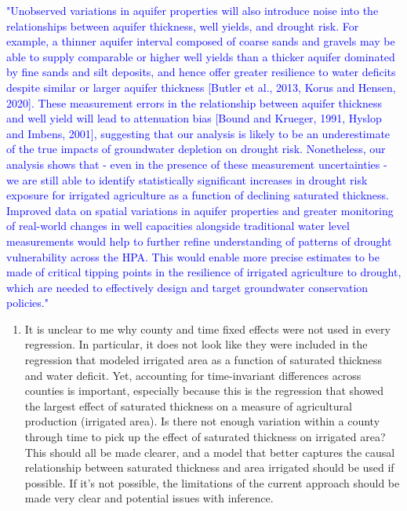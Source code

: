 \documentclass[
]{article}
\providecommand{\tightlist}{%
  \setlength{\itemsep}{0pt}\setlength{\parskip}{0pt}}
\begin{document}
\textcolor{blue}{"Unobserved variations in aquifer properties will also introduce noise into the relationships between aquifer thickness, well yields, and drought risk. For example, a thinner aquifer interval composed of coarse sands and gravels may be able to supply comparable or higher well yields than a thicker aquifer dominated by fine sands and silt deposits, and hence offer greater resilience to water deficits despite similar or larger aquifer thickness [Butler et al., 2013, Korus and Hensen, 2020]. These measurement errors in the relationship between aquifer thickness and well yield will lead to attenuation bias [Bound and Krueger, 1991, Hyslop and Imbens, 2001], suggesting that our analysis is likely to be an underestimate of the true impacts of groundwater depletion on drought risk. Nonetheless, our analysis shows that - even in the presence of these measurement uncertainties - we are still able to identify statistically significant increases in drought risk exposure for irrigated agriculture as a function of declining saturated thickness. Improved data on spatial variations in aquifer properties and greater monitoring of real-world changes in well capacities alongside traditional water level measurements would help to further refine understanding of patterns of drought vulnerability across the HPA. This would enable more precise estimates to be made of critical tipping points in the resilience of irrigated agriculture to drought, which are needed to effectively design and target groundwater conservation policies."}

\begin{enumerate}
\def\labelenumi{\arabic{enumi}.}
\setcounter{enumi}{2}
\tightlist
\item
  It is unclear to me why county and time fixed effects were not used in
  every regression. In particular, it does not look like they were
  included in the regression that modeled irrigated area as a function
  of saturated thickness and water deficit. Yet, accounting for
  time-invariant differences across counties is important, especially
  because this is the regression that showed the largest effect of
  saturated thickness on a measure of agricultural production (irrigated
  area). Is there not enough variation within a county through time to
  pick up the effect of saturated thickness on irrigated area? This
  should all be made clearer, and a model that better captures the
  causal relationship between saturated thickness and area irrigated
  should be used if possible. If it's not possible, the limitations of
  the current approach should be made very clear and potential issues
  with inference.
\end{enumerate}
\end{document}
